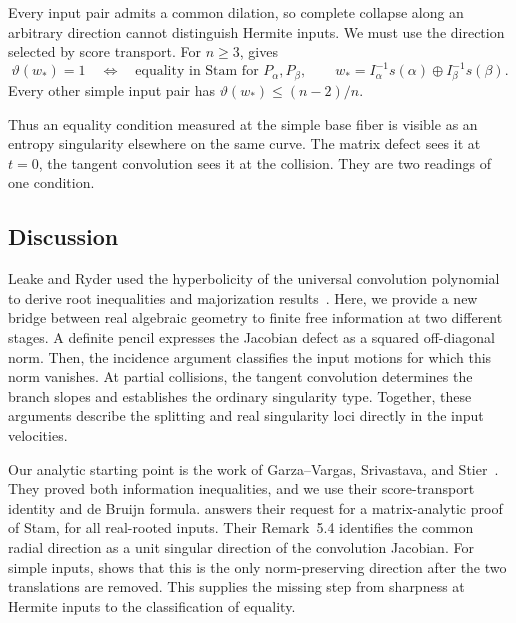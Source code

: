 \documentclass[12pt,reqno]{amsart}
\theoremstyle{definition}
\theoremstyle{remark}
\begin{document}
Every input pair admits a common dilation, so complete collapse along
an arbitrary direction cannot distinguish Hermite inputs.  We must use
the direction selected by score transport.  For \(n\geq3\),
 gives
\begin{equation}\label{eq:intro-entropy-equality-criterion}
 \vartheta(w_*)=1
 \quad\Longleftrightarrow\quad
 \text{equality in Stam for }P_\alpha,P_\beta,
 \qquad
 w_*=I_\alpha^{-1}s(\alpha)\oplus I_\beta^{-1}s(\beta).
\end{equation}
Every other simple input pair has \(\vartheta(w_*)\leq(n-2)/n\).

Thus an equality condition measured at the simple base fiber is visible
as an entropy singularity elsewhere on the same curve.  The matrix defect
sees it at \(t=0\), the tangent convolution sees it at the collision.
They are two readings of one condition.

\subsection{Discussion}
\label{sec:intro-discussion}
Leake and Ryder used the hyperbolicity of the universal convolution
polynomial to derive root inequalities and majorization
results~\cite[Section~1.1]{LeakeRyder18}. Here, we provide a new bridge between real algebraic geometry to finite free information at two different stages. A definite pencil expresses the Jacobian defect as a squared off-diagonal norm. Then, the incidence argument classifies the input motions for which this norm vanishes. At partial collisions, the tangent convolution
determines the branch slopes and establishes the ordinary
singularity type. Together, these arguments describe the splitting
and real singularity loci directly in the input velocities.

Our analytic starting point is the work of Garza--Vargas, Srivastava,
and Stier~\cite{GVS26}. They proved both information inequalities,
and we use their score-transport identity and de Bruijn formula.
 answers their request for a matrix-analytic
proof of Stam, for all real-rooted inputs. Their Remark~5.4
identifies the common radial direction as a unit singular direction
of the convolution Jacobian. For simple inputs,
 shows that this is the only
norm-preserving direction after the two translations are removed.
This supplies the missing step from sharpness at Hermite inputs
to the classification of equality.
\end{document}
